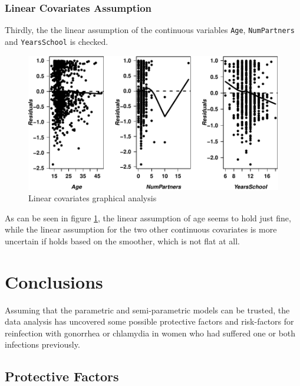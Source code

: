 \documentclass[
]{article}
\begin{document}
\hypertarget{linear-covariates-assumption}{%
\subsubsection{Linear Covariates Assumption}\label{linear-covariates-assumption}}

Thirdly, the the linear assumption of the continuous variables \texttt{Age}, \texttt{NumPartners} and \texttt{YearsSchool} is checked.

\begin{figure}
\centering
\includegraphics{practical_files/figure-latex/linearcovs-1.pdf}
\caption{\label{fig:linearcovs}Linear covariates graphical analysis}
\end{figure}

As can be seen in figure \ref{fig:linearcovs}, the linear assumption of age seems to hold just fine, while the linear assumption for the two other continuous covariates is more uncertain if holds based on the smoother, which is not flat at all.

\hypertarget{conclusions}{%
\section{Conclusions}\label{conclusions}}

Assuming that the parametric and semi-parametric models can be trusted, the data analysis has uncovered some possible protective factors and risk-factors for reinfection with gonorrhea or chlamydia in women who had suffered one or both infections previously.

\hypertarget{protective-factors}{%
\subsection{Protective Factors}\label{protective-factors}}
\end{document}
